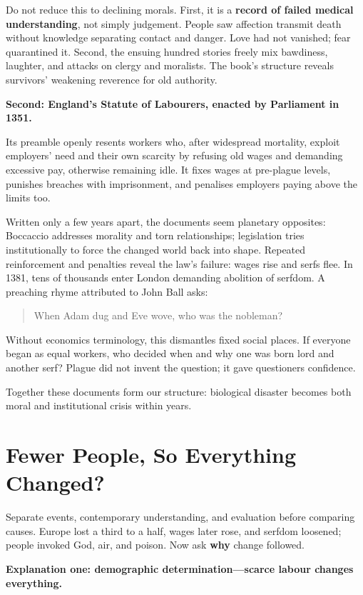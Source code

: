 Do not reduce this to declining morals. First, it is a \textbf{record of failed medical understanding}, not simply judgement. People saw affection transmit death without knowledge separating contact and danger. Love had not vanished; fear quarantined it. Second, the ensuing hundred stories freely mix bawdiness, laughter, and attacks on clergy and moralists. The book's structure reveals survivors' weakening reverence for old authority.

\textbf{Second: England's Statute of Labourers, enacted by Parliament in 1351.}

Its preamble openly resents workers who, after widespread mortality, exploit employers' need and their own scarcity by refusing old wages and demanding excessive pay, otherwise remaining idle. It fixes wages at pre-plague levels, punishes breaches with imprisonment, and penalises employers paying above the limits too.

Written only a few years apart, the documents seem planetary opposites: Boccaccio addresses morality and torn relationships; legislation tries institutionally to force the changed world back into shape. Repeated reinforcement and penalties reveal the law's failure: wages rise and serfs flee. In 1381, tens of thousands enter London demanding abolition of serfdom. A preaching rhyme attributed to John Ball asks:

\begin{quote}
When Adam dug and Eve wove, who was the nobleman?
\end{quote}
Without economics terminology, this dismantles fixed social places. If everyone began as equal workers, who decided when and why one was born lord and another serf? Plague did not invent the question; it gave questioners confidence.

Together these documents form our structure: biological disaster becomes both moral and institutional crisis within years.

\section{Fewer People, So Everything Changed?}
Separate events, contemporary understanding, and evaluation before comparing causes. Europe lost a third to a half, wages later rose, and serfdom loosened; people invoked God, air, and poison. Now ask \textbf{why} change followed.

\textbf{Explanation one: demographic determination---scarce labour changes everything.}


